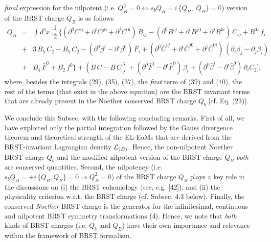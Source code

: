 \documentclass[12pt]{article}
\begin{document}
{\it final} expression for the nilpotent (i.e. $Q_B^2 = 0 \Leftrightarrow s_b Q_B = i\, \{Q_B, \; Q_B \} = 0$) version of the BRST charge $Q_B$ is as follows
\begin{eqnarray}\label{41}
Q_B &=&   \int d^3 x\, \Big [\dfrac{1}{2}\, \Big \{(\partial^0 C^{ij} + \partial^i C^{j0} + \partial^j C^{0i})\, B_{ij} -
(\partial^0 B^{ij} + \partial^i B^{j0} + \partial^j B^{0i})\, C_{ij}
 + B^{0i}\,f_i \nonumber\\
 &+&  3\, \dot B_5 \, C_2 
- B_5 \, \dot C_2 - (\partial^0 \beta^i - \partial^i \beta^0)\, \bar F_i 
+ (\partial^0 \bar C^{ij} + \partial^i \bar C^{j0} + \partial^j \bar C^{0i})\,(\partial_i \beta_j
- \partial_j \beta_i )  \nonumber\\
&+& B_4\, \bar F^0 + B_2\, f^0 \Big \}
+  (\dot B \, C - B \, \dot C) + (\partial^0 \bar F^i - \partial^i \bar F^0)\, \beta_i  
+ (\partial^0 \bar \beta^i - \partial^i \bar \beta^0)\,\partial_i C_2 \Big ],
\end{eqnarray}
where, besides the integrals (29), (35), (37), the {\it first} term of (39) and (40), the rest of the terms 
(that exist in the above equation)  are the BRST invariant terms that are 
already present in the Noether conserved BRST charge $Q_b$ [cf. Eq. (23)].







We conclude this Subsec. with the following concluding remarks. First of all, we have exploited only the partial integration followed by the Gauss
divergence theorem and theoretical strength of the EL-EoMs that are derived from the BRST-invariant Lagrangian density ${\cal L}_{(B)}$. Hence,
the non-nilpotent Noether BRST charge $Q_b$ and the modified nilpotent version of the BRST charge $Q_B$ {\it both} are conserved quantities. Second,
the nilpotency (i.e. $s_b Q_B = + i\, \{Q_B, Q_B \} = 0 \Rightarrow Q_B^2 = 0 $) of the BRST charge $Q_B$ plays a key role in the discussions
on (i) the BRST cohomology (see, e.g. [42]), and (ii) the physicality criterion w.r.t. the BRST charge (cf. Subsec. 4.3 below). Finally, 
the conserved {\it Noether} BRST charge is the generator for the infinitesimal, continuous and nilpotent BRST symmetry transformations (4). Hence,
we note that {\it both} kinds of BRST charges (i.e. $Q_b$ and $Q_B$) 
have their own importance and relevance within the framework of BRST formalism. \\


\end{document}
